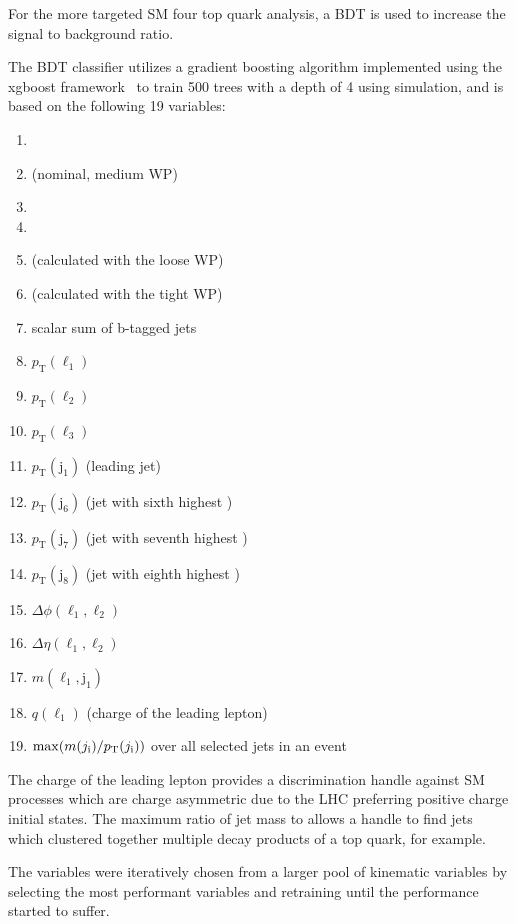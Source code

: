 For the more targeted SM four top quark analysis, a BDT is used to increase the signal to
background ratio.

The BDT classifier utilizes a gradient boosting algorithm 
implemented using the xgboost framework~\cite{MISC:xgboost}
to train 500 trees
with a depth of 4 using simulation, and is based on the following 19
variables:
\begin{enumerate}
    \item \Njets
    \item \Nbjets (nominal, medium WP)
    \item \Nleps
    \item \ptmiss
    \item \Nbjets (calculated with the loose WP)
    \item \Nbjets (calculated with the tight WP)
    \item scalar \pt sum of b-tagged jets
    \item $p_\mathrm{T}(\ell_1)$
    \item $p_\mathrm{T}(\ell_2)$
    \item $p_\mathrm{T}(\ell_3)$
    \item $p_\mathrm{T}(\mathrm{j}_1)$  (leading jet)
    \item $p_\mathrm{T}(\mathrm{j}_6)$ (jet with sixth highest \pt)
    \item $p_\mathrm{T}(\mathrm{j}_7)$ (jet with seventh highest \pt)
    \item $p_\mathrm{T}(\mathrm{j}_8)$ (jet with eighth highest \pt)
    \item $\Delta\phi(\ell_1,\ell_2)$
    \item $\Delta\eta(\ell_1,\ell_2)$
    \item $m(\ell_1,\mathrm{j}_1)$
    \item $q(\ell_1)$ (charge of the leading lepton)
    \item $\mathrm{max}(m(j_\mathrm{i})/p_{\mathrm{T}}(j_\mathrm{i}))$ over all selected jets in an event
\end{enumerate}

The charge of the leading lepton provides a discrimination handle against SM processes which are
charge asymmetric due to the LHC preferring positive charge initial states.
The maximum ratio of jet mass to \pt allows a handle to find jets which clustered together 
multiple decay products of a top quark, for example.

The variables were iteratively chosen from a larger pool of kinematic variables by selecting
the most performant variables and retraining until the performance started to suffer.

